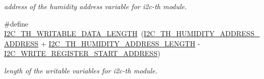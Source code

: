 \begin{DoxyCompactItemize}
\begin{DoxyCompactList}\small\item\em address of the humidity address variable for i2c-\/th module. \end{DoxyCompactList}\item 
\mbox{\label{registers-th_8h_a37f451b20ab84aee9cd8521b5e33a725}} 
\#define \hyperlink{registers-th_8h_a37f451b20ab84aee9cd8521b5e33a725}{I2\+C\+\_\+\+T\+H\+\_\+\+W\+R\+I\+T\+A\+B\+L\+E\+\_\+\+D\+A\+T\+A\+\_\+\+L\+E\+N\+G\+TH}~(\hyperlink{registers-th_8h_a2d41bc44e9839348561ba855d74451dd}{I2\+C\+\_\+\+T\+H\+\_\+\+H\+U\+M\+I\+D\+I\+T\+Y\+\_\+\+A\+D\+D\+R\+E\+S\+S\+\_\+\+A\+D\+D\+R\+E\+SS} + \hyperlink{registers-th_8h_abaf123f62e7e2d51c831c7379e55fba7}{I2\+C\+\_\+\+T\+H\+\_\+\+H\+U\+M\+I\+D\+I\+T\+Y\+\_\+\+A\+D\+D\+R\+E\+S\+S\+\_\+\+L\+E\+N\+G\+TH} -\/ \hyperlink{registers_8h_ad980dee82f83659f0a84e3e1f3c177bb}{I2\+C\+\_\+\+W\+R\+I\+T\+E\+\_\+\+R\+E\+G\+I\+S\+T\+E\+R\+\_\+\+S\+T\+A\+R\+T\+\_\+\+A\+D\+D\+R\+E\+SS})
\begin{DoxyCompactList}\small\item\em length of the writable variables for i2c-\/th module. \end{DoxyCompactList}\end{DoxyCompactItemize}
